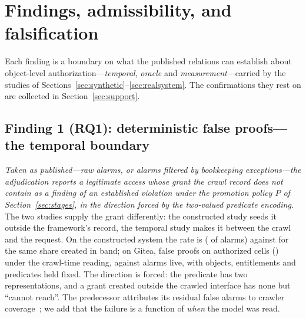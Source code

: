 \section{Findings, admissibility, and falsification}
\label{sec:findings}

Each finding is a boundary on what the published relations can establish about
object-level authorization---\emph{temporal}, \emph{oracle} and
\emph{measurement}---carried by the studies of
Sections~\ref{sec:synthetic}--\ref{sec:realsystem}. The confirmations they rest on are
collected in Section~\ref{sec:support}.

\subsection{Finding 1 (RQ1): deterministic false proofs---the temporal boundary}
\label{sec:boundary1}

\emph{Taken as published---raw alarms, or alarms filtered by bookkeeping exceptions---the
adjudication reports a legitimate access whose grant the crawl record does not contain as
a finding of an established violation under the promotion policy $P$ of
Section~\ref{sec:stages}, in the direction forced by the two-valued predicate encoding.}
The two studies supply the grant differently: the constructed study seeds it outside the
framework's record, the temporal study makes it between the crawl and the request. On the
constructed system the rate is \ResObsOobVtwoFpRate{} (\ResObsOobVtwoFalseProof{} of
\ResObsOobFalseAlarm{} alarms) against \ResObsFwVtwoFalseProof{} for the same share
created in band; on Gitea, \ResRsMrBookkeepingFp{} false proofs on
\ResRsAuthorizedCells{} authorized cells (\ResRsMrBookkeepingFpRate{}) under the
crawl-time reading, against \ResRsMrBookkeepingAlarmsLive{} alarms live, with objects,
entitlements and predicates held fixed. The direction is forced: the predicate has two
representations, and a grant created outside the crawled interface has none but ``cannot
reach''. The predecessor attributes its residual false alarms to crawler
coverage~\cite{Mai2019Metamorphic}; we add that the failure is a function of \emph{when}
the model was read.

